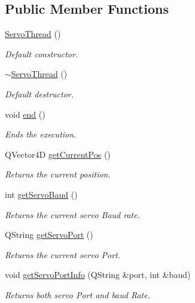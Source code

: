 \subsection*{Public Member Functions}
\begin{DoxyCompactItemize}
\item 
\hyperlink{a00009_af021de9817b11968dd627186e9e05a71}{Servo\+Thread} ()
\begin{DoxyCompactList}\small\item\em Default constructor. \end{DoxyCompactList}\item 
\hyperlink{a00009_a0c7ac1f603a247eac91d9780ad50f5fa}{$\sim$\+Servo\+Thread} ()
\begin{DoxyCompactList}\small\item\em Default destructor. \end{DoxyCompactList}\item 
void \hyperlink{a00009_aaa273318ffee5ba270cdaacba3f263f8}{end} ()
\begin{DoxyCompactList}\small\item\em Ends the execution. \end{DoxyCompactList}\item 
Q\+Vector4\+D \hyperlink{a00009_a19ad0fe74d9f35220bf2864dbcecce2a}{get\+Current\+Pos} ()
\begin{DoxyCompactList}\small\item\em Returns the current position. \end{DoxyCompactList}\item 
int \hyperlink{a00009_af2c9e71c33e15937e72703d859cd7147}{get\+Servo\+Baud} ()
\begin{DoxyCompactList}\small\item\em Returns the current servo Baud rate. \end{DoxyCompactList}\item 
Q\+String \hyperlink{a00009_a3fae25aeac390640192ceb38e32dae40}{get\+Servo\+Port} ()
\begin{DoxyCompactList}\small\item\em Returns the current servo Port. \end{DoxyCompactList}\item 
void \hyperlink{a00009_afcf834d93f1ac9663d6ebaab820e5f74}{get\+Servo\+Port\+Info} (Q\+String \&port, int \&baud)
\begin{DoxyCompactList}\small\item\em Returns both servo Port and baud Rate. \end{DoxyCompactList}\item 

\end{DoxyCompactItemize}
